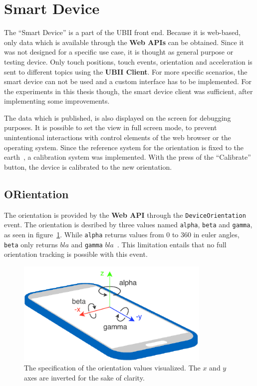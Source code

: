 \section{Smart Device}\label{section:smart-device}

The \enquote{Smart Device} is a part of the \ac{UBII} front end. Because it is web-based, only data which is available through the \textbf{Web \acp{API}} can be obtained. Since it was not designed for a specific use case, it is thought as general purpose or testing device. Only touch positions, touch events, orientation and acceleration is sent to different topics using the \textbf{\ac{UBII} Client}. For more specific scenarios, the smart device can not be used and a custom interface has to be implemented. For the experiments in this thesis though, the smart device client was sufficient, after implementing some improvements.

The data which is published, is also displayed on the screen for debugging purposes. It is possible to set the view in full screen mode, to prevent unintentional interactions with control elements of the web browser or the operating system. Since the reference system for the orientation is fixed to the earth~\cite[Chapter~4.1]{DevicesandSensorsWorkingGroup.2019}, a calibration system was implemented. With the press of the \enquote{Calibrate} button, the device is calibrated to the new orientation.


\subsection{ORientation}\label{subsection:orientation}

The orientation is provided by the \textbf{Web API} through the \lstinline{DeviceOrientation} event. The orientation is desribed by three values named \lstinline{alpha}, \lstinline{beta} and \lstinline{gamma}, as seen in figure~\ref{fig:webapi-device-orientation}. 
While \lstinline{alpha} returns values from $0$ to $360$ in euler angles, \lstinline{beta} only returns $bla$ and \lstinline{gamma} $bla$~\cite{DevicesandSensorsWorkingGroup.2019}.
This limitation entails that no full orientation tracking is possible with this event. 

\begin{figure}[htpb]
  \centering
  \includegraphics[height=5cm]{figures/webapi_device_orientation.pdf}
  \caption[Device Orientation]{The specification of the orientation values visualized. The $x$ and $y$ axes are inverted for the sake of clarity.}\label{fig:webapi-device-orientation}
\end{figure}

